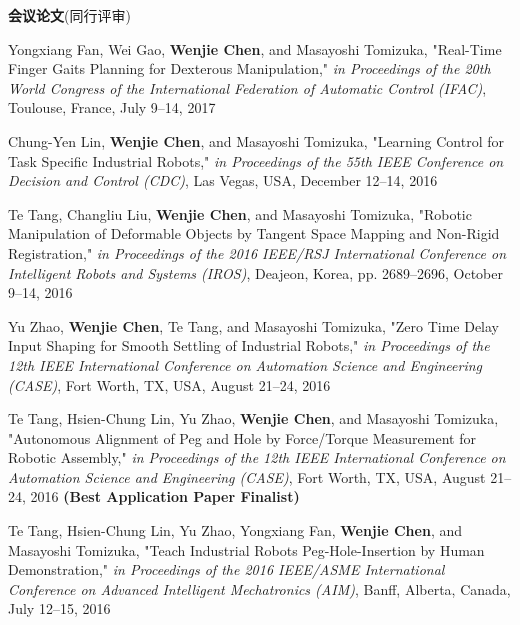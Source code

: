 \documentclass[UTF8,nofonts]{res}
\begin{document}
\begin{resume}
    \textbf{会议论文}(同行评审) %
    \begin{etaremune}[start=26]
    \item Yongxiang Fan, Wei Gao, \textbf{Wenjie Chen}, and Masayoshi Tomizuka, "Real-Time Finger Gaits Planning for Dexterous Manipulation," \emph{in Proceedings of the 20th World Congress of the International Federation of Automatic Control (IFAC)}, Toulouse, France, July 9--14, 2017
    \item Chung-Yen Lin, \textbf{Wenjie Chen}, and Masayoshi Tomizuka, "Learning Control for Task Specific Industrial Robots," \emph{in Proceedings of the 55th IEEE Conference on Decision and Control (CDC)}, Las Vegas, USA, December 12--14, 2016
	\item Te Tang, Changliu Liu, \textbf{Wenjie Chen}, and Masayoshi Tomizuka, "Robotic Manipulation of Deformable Objects by Tangent Space Mapping and Non-Rigid Registration," \emph{in Proceedings of the 2016 IEEE/RSJ International Conference on Intelligent Robots and Systems (IROS)}, Deajeon, Korea, pp. 2689--2696, October 9--14, 2016
	\item Yu Zhao, \textbf{Wenjie Chen}, Te Tang, and Masayoshi Tomizuka, "Zero Time Delay Input Shaping for Smooth Settling of Industrial Robots," \emph{in Proceedings of the 12th IEEE International Conference on Automation Science and Engineering (CASE)}, Fort Worth, TX, USA, August 21--24, 2016
	\item Te Tang, Hsien-Chung Lin, Yu Zhao, \textbf{Wenjie Chen}, and Masayoshi Tomizuka, "Autonomous Alignment of Peg and Hole by Force/Torque Measurement for Robotic Assembly," \emph{in Proceedings of the 12th IEEE International Conference on Automation Science and Engineering (CASE)}, Fort Worth, TX, USA, August 21--24, 2016 \textbf{(Best Application Paper Finalist)}
	\item Te Tang, Hsien-Chung Lin, Yu Zhao, Yongxiang Fan, \textbf{Wenjie Chen}, and Masayoshi Tomizuka, "Teach Industrial Robots Peg-Hole-Insertion by Human Demonstration," \emph{in Proceedings of the 2016 IEEE/ASME International Conference on Advanced Intelligent Mechatronics (AIM)}, Banff, Alberta, Canada, July 12--15, 2016

\end{etaremune}
\end{resume}
\end{document}
